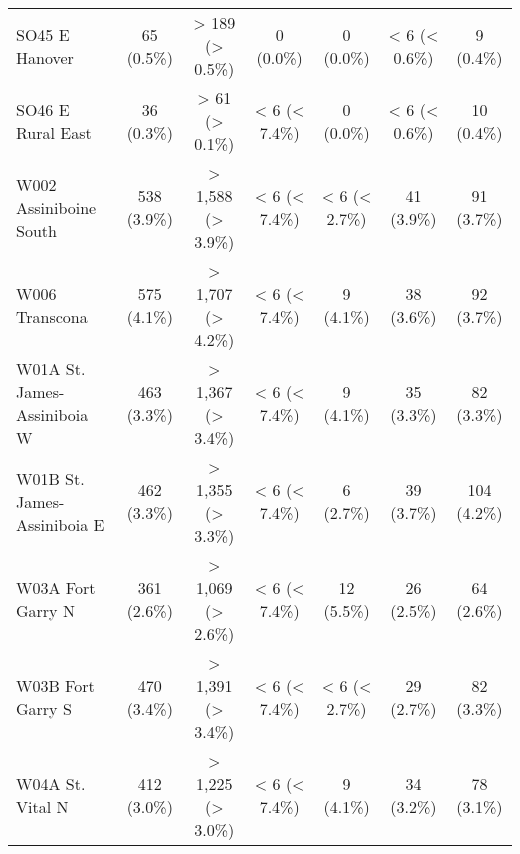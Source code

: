 \documentclass{article}
\begin{document}
\begin{table}[htbp]
\begin{tabular}{l*{6}{c}}
  SO45 E Hanover                                        &            65 (0.5\%)           &         > 189 (> 0.5\%)         &            0 (0.0\%)            &            0 (0.0\%)            &          < 6 (< 0.6\%)          &            9 (0.4\%)            \\
  SO46 E Rural East                                     &            36 (0.3\%)           &          > 61 (> 0.1\%)         &          < 6 (< 7.4\%)          &            0 (0.0\%)            &          < 6 (< 0.6\%)          &            10 (0.4\%)           \\
  W002 Assiniboine South                                &           538 (3.9\%)           &        > 1,588 (> 3.9\%)        &          < 6 (< 7.4\%)          &          < 6 (< 2.7\%)          &            41 (3.9\%)           &            91 (3.7\%)           \\
  W006 Transcona                                        &           575 (4.1\%)           &        > 1,707 (> 4.2\%)        &          < 6 (< 7.4\%)          &            9 (4.1\%)            &            38 (3.6\%)           &            92 (3.7\%)           \\
  W01A St. James-Assiniboia W                           &           463 (3.3\%)           &        > 1,367 (> 3.4\%)        &          < 6 (< 7.4\%)          &            9 (4.1\%)            &            35 (3.3\%)           &            82 (3.3\%)           \\
  W01B St. James-Assiniboia E                           &           462 (3.3\%)           &        > 1,355 (> 3.3\%)        &          < 6 (< 7.4\%)          &            6 (2.7\%)            &            39 (3.7\%)           &           104 (4.2\%)           \\
  W03A Fort Garry N                                     &           361 (2.6\%)           &        > 1,069 (> 2.6\%)        &          < 6 (< 7.4\%)          &            12 (5.5\%)           &            26 (2.5\%)           &            64 (2.6\%)           \\
  W03B Fort Garry S                                     &           470 (3.4\%)           &        > 1,391 (> 3.4\%)        &          < 6 (< 7.4\%)          &          < 6 (< 2.7\%)          &            29 (2.7\%)           &            82 (3.3\%)           \\
  W04A St. Vital N                                      &           412 (3.0\%)           &        > 1,225 (> 3.0\%)        &          < 6 (< 7.4\%)          &            9 (4.1\%)            &            34 (3.2\%)           &            78 (3.1\%)           \\

\end{tabular}
\end{table}
\end{document}
